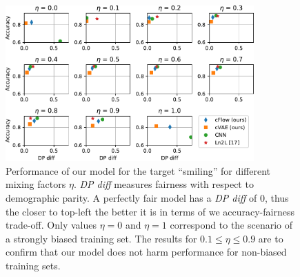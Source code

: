 \begin{figure}[tb]
    \centering
    \includegraphics[width=0.85\textwidth]{paper2/Figures/nosinn_celeba_multiplot_all_landscape_Smiling.pdf}
    \caption{
        Performance of our model for the target ``smiling'' for different mixing factors $\eta$.
        \emph{DP diff} measures fairness with respect to demographic parity.
        A perfectly fair model has a \emph{DP diff} of 0, thus the closer to top-left the better it is in terms of we accuracy-fairness trade-off.
        Only values $\eta=0$ and $\eta=1$ correspond to the scenario of a strongly biased training set.
        The results for $0.1\leq \eta\leq 0.9$ are to confirm that our model does not harm performance for non-biased training sets.
    }%
    \label{fig:celeba-multiplot}
\end{figure}

